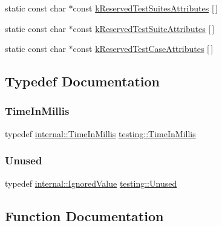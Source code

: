 \begin{DoxyCompactItemize}
\item 
static const char $\ast$const \mbox{\hyperlink{namespacetesting_afa194c15a2ac0e03029019b0f4029968}{k\+Reserved\+Test\+Suites\+Attributes}} \mbox{[}$\,$\mbox{]}
\item 
static const char $\ast$const \mbox{\hyperlink{namespacetesting_af44b2969928d37e9081145760f21e79a}{k\+Reserved\+Test\+Suite\+Attributes}} \mbox{[}$\,$\mbox{]}
\item 
static const char $\ast$const \mbox{\hyperlink{namespacetesting_ae9689f28cd859736f734623b26c93d88}{k\+Reserved\+Test\+Case\+Attributes}} \mbox{[}$\,$\mbox{]}
\end{DoxyCompactItemize}


\subsection{Typedef Documentation}
\mbox{\label{namespacetesting_a992de1d091ce660f451d1e8b3ce30fd6}} 
\subsubsection{\texorpdfstring{TimeInMillis}{TimeInMillis}}
{\footnotesize\ttfamily typedef \mbox{\hyperlink{namespacetesting_1_1internal_a66a845df404b38fe85c5e14a069f255a}{internal\+::\+Time\+In\+Millis}} \mbox{\hyperlink{namespacetesting_a992de1d091ce660f451d1e8b3ce30fd6}{testing\+::\+Time\+In\+Millis}}}

\mbox{\label{namespacetesting_a603e329ec0263ebfcf16f712810bd511}} 
\subsubsection{\texorpdfstring{Unused}{Unused}}
{\footnotesize\ttfamily typedef \mbox{\hyperlink{classtesting_1_1internal_1_1IgnoredValue}{internal\+::\+Ignored\+Value}} \mbox{\hyperlink{namespacetesting_a603e329ec0263ebfcf16f712810bd511}{testing\+::\+Unused}}}



\subsection{Function Documentation}
\mbox{\label{namespacetesting_a3d58f0d746946064154cd257d368599d}} 

